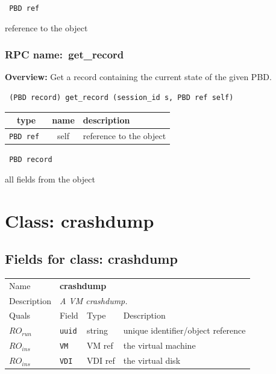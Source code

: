 \vspace{0.3cm}

{\tt 
PBD ref
}


reference to the object
\vspace{0.3cm}
\vspace{0.3cm}
\vspace{0.3cm}
\subsubsection{RPC name:~get\_record}

{\bf Overview:} 
Get a record containing the current state of the given PBD.

\begin{verbatim} (PBD record) get_record (session_id s, PBD ref self)\end{verbatim}



 
\vspace{0.3cm}
\begin{tabular}{|c|c|p{7cm}|}
 \hline
{\bf type} & {\bf name} & {\bf description} \\ \hline
{\tt PBD ref } & self & reference to the object \\ \hline 

\end{tabular}

\vspace{0.3cm}

{\tt 
PBD record
}


all fields from the object
\vspace{0.3cm}
\vspace{0.3cm}
\vspace{0.3cm}

\vspace{1cm}
\newpage
\section{Class: crashdump}
\subsection{Fields for class: crashdump}
\begin{longtable}{|lllp{}|}
\hline
\multicolumn{1}{|l}{Name} & \multicolumn{3}{l|}{\bf crashdump} \\
\multicolumn{1}{|l}{Description} & \multicolumn{3}{l|}{\parbox{11cm}{\em A
VM crashdump.}} \\
\hline
Quals & Field & Type & Description \\
\hline
$\mathit{RO}_\mathit{run}$ &  {\tt uuid} & string & unique identifier/object reference \\
$\mathit{RO}_\mathit{ins}$ &  {\tt VM} & VM ref & the virtual machine \\
$\mathit{RO}_\mathit{ins}$ &  {\tt VDI} & VDI ref & the virtual disk \\
\hline
\end{longtable}
